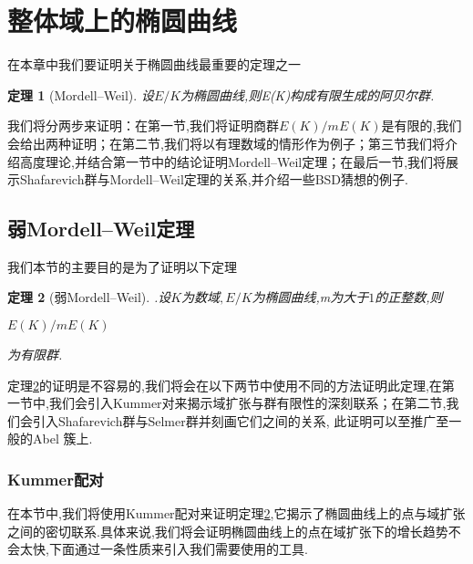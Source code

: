 \documentclass[11pt]{ctexart}
\newtheorem{thm}{定理}[section]
\begin{document}
\section{整体域上的椭圆曲线}
在本章中我们要证明关于椭圆曲线最重要的定理之一
\begin{thm}[Mordell--Weil]\label{mwt}
    设$E/K$为椭圆曲线,则E(K)构成有限生成的阿贝尔群.





\end{thm}

我们将分两步来证明：在第一节,我们将证明商群$E(K)/mE(K)$是有限的,我们会给出两种证明；在第二节,我们将以有理数域的情形作为例子；第三节我们将介绍高度理论,并结合第一节中的结论证明Mordell--Weil定理；在最后一节,我们将展示Shafarevich群与Mordell--Weil定理的关系,并介绍一些BSD猜想的例子.

\subsection{弱Mordell--Weil定理}
我们本节的主要目的是为了证明以下定理
\begin{thm}[弱Mordell--Weil].\label{wmt}设$K$为数域$,E/K$为椭圆曲线,m为大于$1$的正整数,则
\begin{center}
    $E(K)/mE(K)$
\end{center}
为有限群.
\end{thm}
定理\ref{wmt}的证明是不容易的,我们将会在以下两节中使用不同的方法证明此定理,在第一节中,我们会引入Kummer对来揭示域扩张与群有限性的深刻联系；在第二节,我们会引入Shafarevich群与Selmer群并刻画它们之间的关系, 此证明可以至推广至一般的Abel 簇上.
\subsubsection{Kummer配对}

在本节中,我们将使用Kummer配对来证明定理\ref{wmt},它揭示了椭圆曲线上的点与域扩张之间的密切联系.具体来说,我们将会证明椭圆曲线上的点在域扩张下的增长趋势不会太快,下面通过一条性质来引入我们需要使用的工具.
\end{document}
